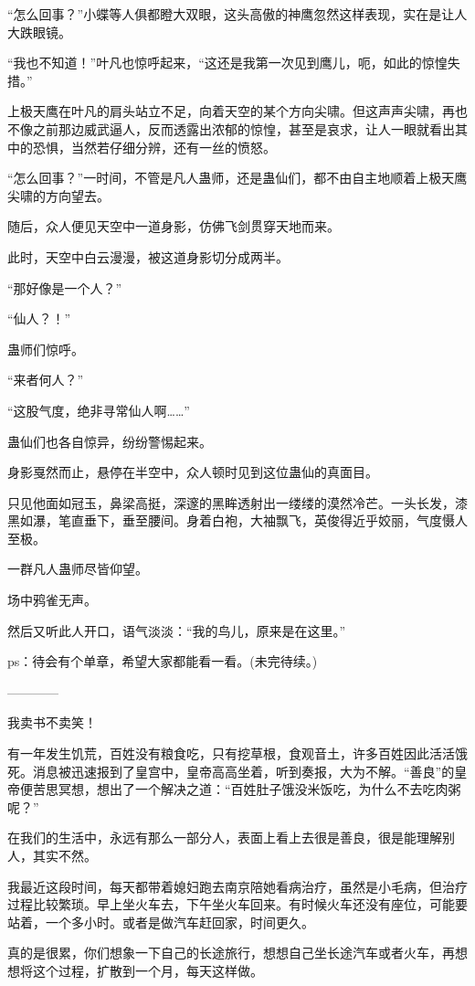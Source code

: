 \begin{this_body}
“怎么回事？”小蝶等人俱都瞪大双眼，这头高傲的神鹰忽然这样表现，实在是让人大跌眼镜。

“我也不知道！”叶凡也惊呼起来，“这还是我第一次见到鹰儿，呃，如此的惊惶失措。”

上极天鹰在叶凡的肩头站立不足，向着天空的某个方向尖啸。但这声声尖啸，再也不像之前那边威武逼人，反而透露出浓郁的惊惶，甚至是哀求，让人一眼就看出其中的恐惧，当然若仔细分辨，还有一丝的愤怒。

“怎么回事？”一时间，不管是凡人蛊师，还是蛊仙们，都不由自主地顺着上极天鹰尖啸的方向望去。

随后，众人便见天空中一道身影，仿佛飞剑贯穿天地而来。

此时，天空中白云漫漫，被这道身影切分成两半。

“那好像是一个人？”

“仙人？！”

蛊师们惊呼。

“来者何人？”

“这股气度，绝非寻常仙人啊……”

蛊仙们也各自惊异，纷纷警惕起来。

身影戛然而止，悬停在半空中，众人顿时见到这位蛊仙的真面目。

只见他面如冠玉，鼻梁高挺，深邃的黑眸透射出一缕缕的漠然冷芒。一头长发，漆黑如瀑，笔直垂下，垂至腰间。身着白袍，大袖飘飞，英俊得近乎姣丽，气度慑人至极。

一群凡人蛊师尽皆仰望。

场中鸦雀无声。

然后又听此人开口，语气淡淡：“我的鸟儿，原来是在这里。”

ps：待会有个单章，希望大家都能看一看。(未完待续。)

------------

我卖书不卖笑！

有一年发生饥荒，百姓没有粮食吃，只有挖草根，食观音土，许多百姓因此活活饿死。消息被迅速报到了皇宫中，皇帝高高坐着，听到奏报，大为不解。“善良”的皇帝便苦思冥想，想出了一个解决之道：“百姓肚子饿没米饭吃，为什么不去吃肉粥呢？”

在我们的生活中，永远有那么一部分人，表面上看上去很是善良，很是能理解别人，其实不然。

我最近这段时间，每天都带着媳妇跑去南京陪她看病治疗，虽然是小毛病，但治疗过程比较繁琐。早上坐火车去，下午坐火车回来。有时候火车还没有座位，可能要站着，一个多小时。或者是做汽车赶回家，时间更久。

真的是很累，你们想象一下自己的长途旅行，想想自己坐长途汽车或者火车，再想想将这个过程，扩散到一个月，每天这样做。


\end{this_body}
